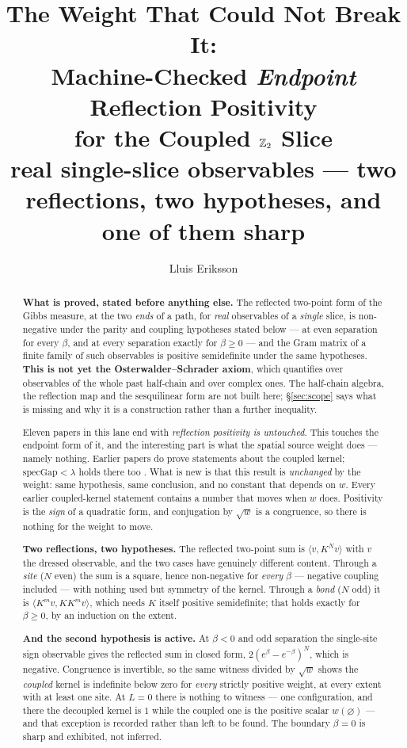 \documentclass[11pt]{article}
\title{The Weight That Could Not Break It:\\
Machine-Checked \emph{Endpoint} Reflection Positivity\\
for the Coupled $\mathbb{Z}_2$ Slice\\
\large real single-slice observables --- two reflections, two hypotheses,
and one of them sharp}
\author{Lluis Eriksson}
\date{}
\theoremstyle{definition}
\begin{document}
\maketitle

\begin{abstract}
\textbf{What is proved, stated before anything else.}  The reflected two-point
form of the Gibbs measure, at the two \emph{ends} of a path, for \emph{real}
observables of a \emph{single} slice, is non-negative under the parity and
coupling hypotheses stated below --- at even separation for every $\beta$, and
at every separation exactly for $\beta\ge0$ --- and the Gram matrix of a finite
family of such observables is positive semidefinite under the same hypotheses.  \textbf{This is not
yet the Osterwalder--Schrader axiom}, which quantifies over observables of the
whole past half-chain and over complex ones.  The half-chain algebra, the
reflection map and the sesquilinear form are not built here; \S\ref{sec:scope}
says what is missing and why it is a construction rather than a further
inequality.

Eleven papers in this lane end with \emph{reflection positivity is untouched}.
This touches the endpoint form of it, and the interesting part is what the
spatial source weight does --- namely nothing.  Earlier papers do prove
statements about the coupled kernel; $\mathrm{specGap}<\lambda$ holds there too
\cite{ErikssonSpectral}.  What is new is that this result is \emph{unchanged} by
the weight: same hypothesis, same conclusion, and no constant that depends on
$w$.  Every earlier coupled-kernel statement contains a number that moves when
$w$ does.  Positivity is the \emph{sign} of a quadratic form, and conjugation by
$\sqrt{w}$ is a congruence, so there is nothing for the weight to move.

\textbf{Two reflections, two hypotheses.}  The reflected two-point sum is
$\langle v, K^{N} v\rangle$ with $v$ the dressed observable, and the two cases
have genuinely different content.  Through a \emph{site} ($N$ even) the sum is a
square, hence non-negative for \emph{every} $\beta$ --- negative coupling
included --- with nothing used but symmetry of the kernel.  Through a
\emph{bond} ($N$ odd) it is $\langle K^{m}v, K K^{m} v\rangle$, which needs $K$
itself positive semidefinite; that holds exactly for $\beta\ge0$, by an
induction on the extent.

\textbf{And the second hypothesis is active.}  At $\beta<0$ and odd separation
the single-site sign observable gives the reflected sum in closed form,
$2(e^{\beta}-e^{-\beta})^{N}$, which is negative.  Congruence is invertible, so
the same witness divided by $\sqrt{w}$ shows the \emph{coupled} kernel is
indefinite below zero for \emph{every} strictly positive weight, at every extent
with at least one site.  At $L=0$ there is nothing to witness --- one
configuration, and there the decoupled kernel is $1$ while the coupled one is
the positive scalar $w(\varnothing)$ --- and that exception is recorded rather
than left to be found.  The boundary $\beta=0$ is sharp and exhibited, not inferred.


\end{abstract}
\end{document}
